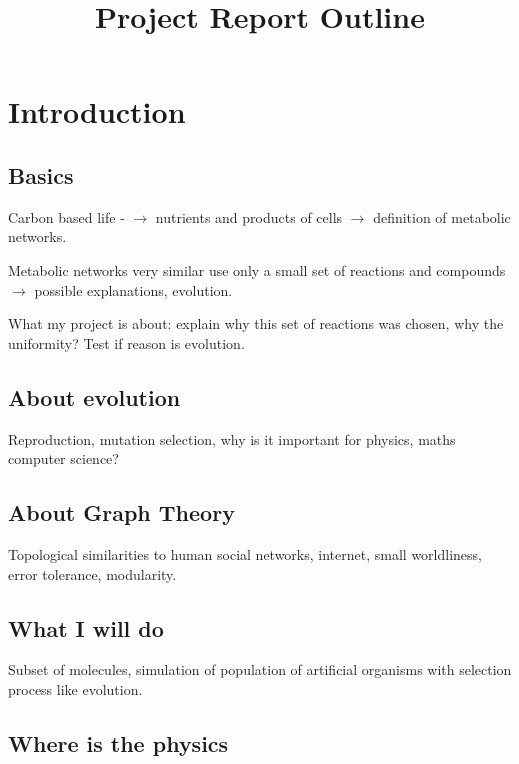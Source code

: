 \documentclass[]{article}
\title{Project Report Outline}
\author{}
\date{}
\begin{document}
\maketitle

\section{Introduction}
\label{sec:introduction}

\subsection{Basics}
\label{sub:basics}

Carbon based life - $\rightarrow$ nutrients and products of cells $\rightarrow$ definition of metabolic networks. 

Metabolic networks very similar use only a small set of reactions and compounds $\rightarrow$ possible explanations, evolution.

What my project is about: explain why this set of reactions was chosen, why the uniformity? Test if reason is evolution.

\subsection{About evolution}
\label{sub:About evolution}
Reproduction, mutation selection, why is it important for physics, maths computer science?

\subsection{About Graph Theory}
\label{sub:About Graph THeory}

Topological similarities to human social networks, internet, small worldliness, error tolerance, modularity. 

\subsection{What I will do}
\label{sub:What I will do}

Subset of molecules, simulation of population of artificial organisms with selection process like evolution. 

\subsection{Where is the physics}
\label{sub:Where is the physics}
\end{document}
